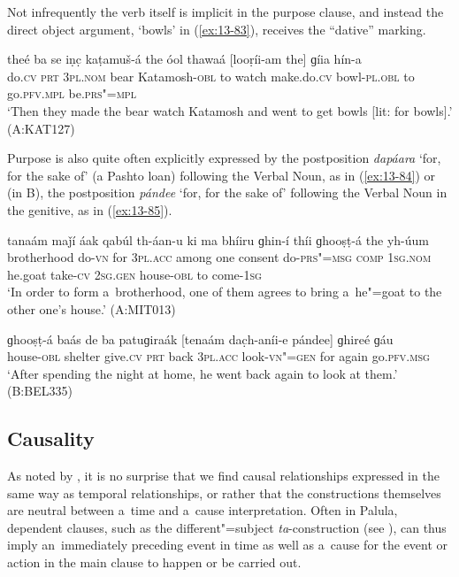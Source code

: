 Not infrequently the verb itself is implicit in the purpose clause, and instead the direct object argument, `bowls' in (\ref{ex:13-83}), receives the ``dative'' marking.

\begin{exe}
\ex
\label{ex:13-83}
\gll theé ba se iṇc̣ kaṭamuš-á the óol thawaá [looṛíi-am the] ɡíia hín-a \\
do.\textsc{cv} \textsc{prt} \textsc{3pl.nom} bear Katamosh-\textsc{obl} to watch  make.do.\textsc{cv} bowl-\textsc{pl.obl} to go.\textsc{pfv.mpl} be.\textsc{prs"=mpl} \\
\glt `Then they made the bear watch Katamosh and went to get bowls [lit: for bowls].' (A:KAT127) 
\end{exe}

Purpose is also quite often explicitly expressed by the postposition \textit{dapáara} `for, for the sake of' (a Pashto loan) following the Verbal Noun, as in (\ref{ex:13-84}) or (in B), the postposition \textit{pándee} `for, for the sake of' following the Verbal Noun in the genitive, as in (\ref{ex:13-85}).

\begin{exe}
\ex
\label{ex:13-84}
\gll [bhraawéeli th"=ainií dapáara] tanaám maǰí áak qabúl th-áan-u ki ma bhíiru ɡhin-í thíi ɡhooṣṭ-á the yh-úum \\
brotherhood do-\textsc{vn} for \textsc{3pl.acc} among one consent do-\textsc{prs"=msg} \textsc{comp} \textsc{1sg.nom} he.goat take-\textsc{cv} \textsc{2sg.gen}  house-\textsc{obl} to come-\textsc{1sg} \\
\glt `In order to form a~brotherhood, one of them agrees to bring a~he"=goat to the other one's house.' (A:MIT013)

\ex
\label{ex:13-85}
\gll ɡhooṣṭ-á baás de ba patuɡiraák [tenaám dac̣h-aníi-e pándee] ɡhireé ɡáu \\
house-\textsc{obl}  shelter give.\textsc{cv} \textsc{prt} back \textsc{3pl.acc}  look-\textsc{vn"=gen} for again go.\textsc{pfv.msg} \\
\glt `After spending the night at home, he went back again to look at them.' (B:BEL335)
\end{exe}

\subsection{Causality}
\label{subsec:13-4-3}

As noted by \citet[247]{thompsonetal2007}, it is no surprise that we find causal relationships expressed in the same way as temporal relationships, or rather that the constructions themselves are neutral between a~time and a~cause interpretation. Often in Palula, dependent clauses, such as the different"=subject \textit{ta}-construction (see ), can thus imply an~immediately preceding event in time as well as a~cause for the event or action in the main clause to happen or be carried out. 



